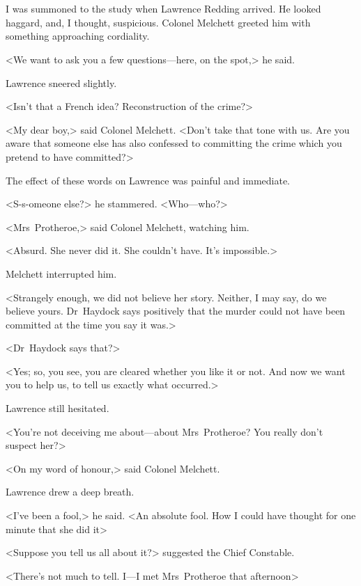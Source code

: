\chapter[Chapter  \thechapter]{}


\lettrine{I}{} was summoned to the study when Lawrence Redding arrived. He looked haggard, and, I thought, suspicious. Colonel Melchett greeted him with something approaching cordiality.

\zz
<We want to ask you a few questions—here, on the spot,> he said.

Lawrence sneered slightly.

<Isn't that a French idea? Reconstruction of the crime?>

<My dear boy,> said Colonel Melchett. <Don't take that tone with us. Are you aware that someone else has also confessed to committing the crime which you pretend to have committed?>

The effect of these words on Lawrence was painful and immediate.

<S-s-omeone else?> he stammered. <Who—who?>

<Mrs~Protheroe,> said Colonel Melchett, watching him.

<Absurd. She never did it. She couldn't have. It's impossible.>

Melchett interrupted him.

<Strangely enough, we did not believe her story. Neither, I may say, do we believe yours. Dr~Haydock says positively that the murder could not have been committed at the time you say it was.>

<Dr~Haydock says that?>

<Yes; so, you see, you are cleared whether you like it or not. And now we want you to help us, to tell us exactly what occurred.>

Lawrence still hesitated.

<You're not deceiving me about—about Mrs~Protheroe? You really don't suspect her?>

<On my word of honour,> said Colonel Melchett.

Lawrence drew a deep breath.

<I've been a fool,> he said. <An absolute fool. How I could have thought for one minute that she did it\longdash>

<Suppose you tell us all about it?> suggested the Chief Constable.

<There's not much to tell. I—I met Mrs~Protheroe that afternoon\longdash>

